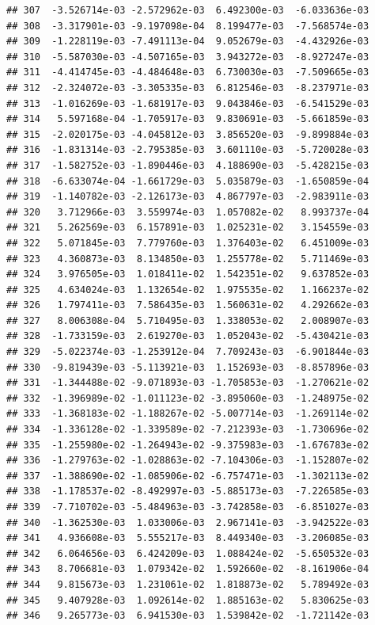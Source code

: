 \documentclass[
]{article}
\begin{document}
\begin{verbatim}
## 307  -3.526714e-03 -2.572962e-03  6.492300e-03  -6.033636e-03
## 308  -3.317901e-03 -9.197098e-04  8.199477e-03  -7.568574e-03
## 309  -1.228119e-03 -7.491113e-04  9.052679e-03  -4.432926e-03
## 310  -5.587030e-03 -4.507165e-03  3.943272e-03  -8.927247e-03
## 311  -4.414745e-03 -4.484648e-03  6.730030e-03  -7.509665e-03
## 312  -2.324072e-03 -3.305335e-03  6.812546e-03  -8.237971e-03
## 313  -1.016269e-03 -1.681917e-03  9.043846e-03  -6.541529e-03
## 314   5.597168e-04 -1.705917e-03  9.830691e-03  -5.661859e-03
## 315  -2.020175e-03 -4.045812e-03  3.856520e-03  -9.899884e-03
## 316  -1.831314e-03 -2.795385e-03  3.601110e-03  -5.720028e-03
## 317  -1.582752e-03 -1.890446e-03  4.188690e-03  -5.428215e-03
## 318  -6.633074e-04 -1.661729e-03  5.035879e-03  -1.650859e-04
## 319  -1.140782e-03 -2.126173e-03  4.867797e-03  -2.983911e-03
## 320   3.712966e-03  3.559974e-03  1.057082e-02   8.993737e-04
## 321   5.262569e-03  6.157891e-03  1.025231e-02   3.154559e-03
## 322   5.071845e-03  7.779760e-03  1.376403e-02   6.451009e-03
## 323   4.360873e-03  8.134850e-03  1.255778e-02   5.711469e-03
## 324   3.976505e-03  1.018411e-02  1.542351e-02   9.637852e-03
## 325   4.634024e-03  1.132654e-02  1.975535e-02   1.166237e-02
## 326   1.797411e-03  7.586435e-03  1.560631e-02   4.292662e-03
## 327   8.006308e-04  5.710495e-03  1.338053e-02   2.008907e-03
## 328  -1.733159e-03  2.619270e-03  1.052043e-02  -5.430421e-03
## 329  -5.022374e-03 -1.253912e-04  7.709243e-03  -6.901844e-03
## 330  -9.819439e-03 -5.113921e-03  1.152693e-03  -8.857896e-03
## 331  -1.344488e-02 -9.071893e-03 -1.705853e-03  -1.270621e-02
## 332  -1.396989e-02 -1.011123e-02 -3.895060e-03  -1.248975e-02
## 333  -1.368183e-02 -1.188267e-02 -5.007714e-03  -1.269114e-02
## 334  -1.336128e-02 -1.339589e-02 -7.212393e-03  -1.730696e-02
## 335  -1.255980e-02 -1.264943e-02 -9.375983e-03  -1.676783e-02
## 336  -1.279763e-02 -1.028863e-02 -7.104306e-03  -1.152807e-02
## 337  -1.388690e-02 -1.085906e-02 -6.757471e-03  -1.302113e-02
## 338  -1.178537e-02 -8.492997e-03 -5.885173e-03  -7.226585e-03
## 339  -7.710702e-03 -5.484963e-03 -3.742858e-03  -6.851027e-03
## 340  -1.362530e-03  1.033006e-03  2.967141e-03  -3.942522e-03
## 341   4.936608e-03  5.555217e-03  8.449340e-03  -3.206085e-03
## 342   6.064656e-03  6.424209e-03  1.088424e-02  -5.650532e-03
## 343   8.706681e-03  1.079342e-02  1.592660e-02  -8.161906e-04
## 344   9.815673e-03  1.231061e-02  1.818873e-02   5.789492e-03
## 345   9.407928e-03  1.092614e-02  1.885163e-02   5.830625e-03
## 346   9.265773e-03  6.941530e-03  1.539842e-02  -1.721142e-03

\end{verbatim}
\end{document}
